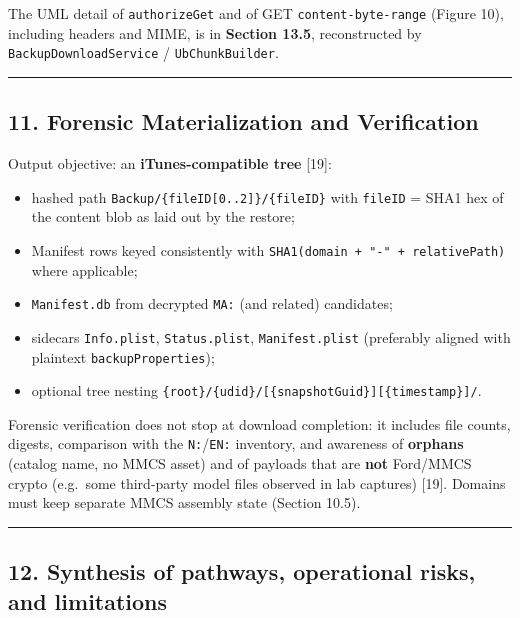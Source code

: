 \documentclass[
  english,
  10pt]{article}
\providecommand{\tightlist}{%
  \setlength{\itemsep}{0pt}\setlength{\parskip}{0pt}}
\begin{document}
The UML detail of \texttt{authorizeGet} and of GET
\texttt{content-byte-range} (Figure 10), including headers and MIME, is
in \textbf{Section 13.5}, reconstructed by
\texttt{BackupDownloadService} / \texttt{UbChunkBuilder}.

\begin{center}\rule{0.5\linewidth}{0.5pt}\end{center}

\subsection{11. Forensic Materialization and
Verification}\label{forensic-materialization-and-verification}

Output objective: an \textbf{iTunes-compatible tree} {[}19{]}:

\begin{itemize}
\tightlist
\item
  hashed path \texttt{Backup/\{fileID{[}0..2{]}\}/\{fileID\}} with
  \texttt{fileID} = SHA1 hex of the content blob as laid out by the
  restore;
\item
  Manifest rows keyed consistently with
  \texttt{SHA1(domain\ +\ "-"\ +\ relativePath)} where applicable;
\item
  \texttt{Manifest.db} from decrypted \texttt{MA:} (and related)
  candidates;
\item
  sidecars \texttt{Info.plist}, \texttt{Status.plist},
  \texttt{Manifest.plist} (preferably aligned with plaintext
  \texttt{backupProperties});
\item
  optional tree nesting
  \texttt{\{root\}/\{udid\}/{[}\{snapshotGuid\}{]}{[}\{timestamp\}{]}/}.
\end{itemize}

Forensic verification does not stop at download completion: it includes
file counts, digests, comparison with the \texttt{N:}/\texttt{EN:}
inventory, and awareness of \textbf{orphans} (catalog name, no MMCS
asset) and of payloads that are \textbf{not} Ford/MMCS crypto (e.g.~some
third-party model files observed in lab captures) {[}19{]}. Domains must
keep separate MMCS assembly state (Section 10.5).

\begin{center}\rule{0.5\linewidth}{0.5pt}\end{center}

\subsection{12. Synthesis of pathways, operational risks, and
limitations}\label{synthesis-of-pathways-operational-risks-and-limitations}
\end{document}
